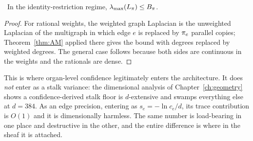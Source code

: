 \begin{proposition}\label{prop:weightedAM}
\Proved\ In the identity-restriction regime,
$\lambda_{\max}(L_\pi)\le B_\pi$.
\end{proposition}
\begin{proof}
For rational weights, the weighted graph Laplacian is the unweighted
Laplacian of the multigraph in which edge $e$ is replaced by $\pi_e$
parallel copies; Theorem~\ref{thm:AM} applied there gives the bound with
degrees replaced by weighted degrees. The general case follows because
both sides are continuous in the weights and the rationals are dense.
\end{proof}

\begin{hon}\Hon
This is where organ-level confidence legitimately enters the
architecture. It does \emph{not} enter as a stalk variance: the
dimensional analysis of Chapter~\ref{ch:geometry} shows a
confidence-derived stalk floor is $d$-extensive and swamps everything
else at $d=384$. As an edge precision, entering as $s_e=-\ln c_e/d$, its
trace contribution is $O(1)$ and it is dimensionally harmless. The same
number is load-bearing in one place and destructive in the other, and
the entire difference is where in the sheaf it is attached.
\end{hon}
